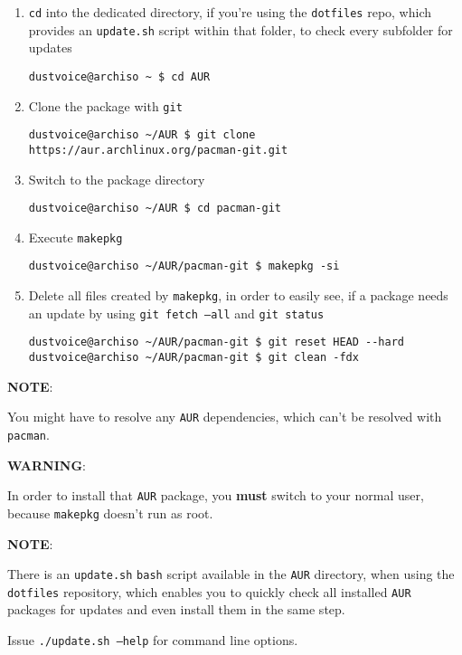 \documentclass[9pt]{report}
\newcommand{\admonition}[2]{\textbf{#1}: {#2}}
\begin{document}
\begin{enumerate}

\item{\texttt{cd} into the dedicated directory, if you’re using the \texttt{dotfiles} repo, which provides an \texttt{update.sh} script within that folder, to check every subfolder for updates}

\begin{verbatim}
dustvoice@archiso ~ $ cd AUR
\end{verbatim}
\item{Clone the package with \texttt{git}}

\begin{verbatim}
dustvoice@archiso ~/AUR $ git clone https://aur.archlinux.org/pacman-git.git
\end{verbatim}
\item{Switch to the package directory}

\begin{verbatim}
dustvoice@archiso ~/AUR $ cd pacman-git
\end{verbatim}
\item{Execute \texttt{makepkg}}

\begin{verbatim}
dustvoice@archiso ~/AUR/pacman-git $ makepkg -si
\end{verbatim}
\item{Delete all files created by \texttt{makepkg}, in order to easily see, if a package needs an update by using \texttt{git fetch --all} and \texttt{git status}}

\begin{verbatim}
dustvoice@archiso ~/AUR/pacman-git $ git reset HEAD --hard
dustvoice@archiso ~/AUR/pacman-git $ git clean -fdx
\end{verbatim}
\end{enumerate}


\admonition{NOTE}{You might have to resolve any \texttt{AUR} dependencies, which can’t be resolved with \texttt{pacman}.

}
\admonition{WARNING}{In order to install that \texttt{AUR} package, you \textbf{must} switch to your normal user, because \texttt{makepkg} doesn’t run as root.

}
\admonition{NOTE}{There is an \texttt{update.sh} \texttt{bash} script available in the \texttt{AUR} directory, when using the \texttt{dotfiles} repository, which enables you to quickly check all installed \texttt{AUR} packages for updates and even install them in the same step.


Issue \texttt{./update.sh --help} for command line options.

}
\end{document}
